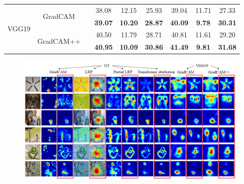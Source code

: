 \begin{table}
{\begin{tabular}{ccccccccc}
	\hline
	\multirow{4}{*}{VGG19} & \multirow{2}{*}{GradCAM}                 &                       & 38.08          & 12.15          & 25.93          & 39.04          & 11.71          & 27.33           \\ 
	\cline{4-9}
	&                                          & \checkmark                     & \textbf{39.07} & \textbf{10.20} & \textbf{28.87} & \textbf{40.09} & \textbf{9.78}  & \textbf{30.31}  \\ 
	\cline{2-9}
	& \multirow{2}{*}{GradCAM++}               &                       & 40.50          & 11.79          & 28.71          & 40.81          & 11.61          & 29.20           \\ 
	\cline{4-9}
	&                                          & \checkmark                     & \textbf{40.95} & \textbf{10.09} & \textbf{30.86} & \textbf{41.49} & \textbf{9.81}  & \textbf{31.68}  \\
	\hline
\end{tabular}
}
\end{table}

\begin{figure}[h]
	\centering 
	\includegraphics[width=15cm]{fig/ch4/Contrast.png}
	\label{fig:contrast1}
\end{figure}

